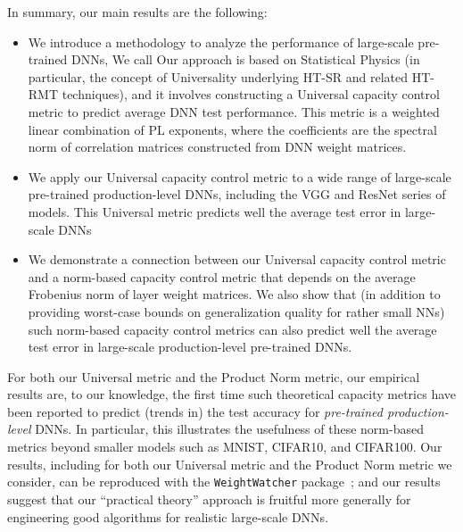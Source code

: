 In summary, our main results are the following:
\begin{itemize}
\item
We introduce a  methodology to analyze the performance of large-scale pre-trained DNNs, 
We call 
Our approach is based on Statistical Physics (in particular, the concept of Universality underlying HT-SR and related HT-RMT techniques), and it involves constructing a Universal capacity control metric to predict average DNN test performance.
This metric is a weighted linear combination of PL exponents, where the coefficients are the spectral norm of correlation matrices constructed from DNN weight matrices.
\item
We apply our Universal capacity control metric to a wide range of large-scale pre-trained production-level DNNs, including the VGG and ResNet series of models.
This Universal metric predicts well the average test error in large-scale DNNs
\item
We demonstrate a connection between our Universal capacity control metric and a norm-based capacity control metric that depends on the average Frobenius norm of layer weight matrices.
We also show that (in addition to providing worst-case bounds on generalization quality for rather small NNs) such norm-based capacity control metrics can also predict well the average test error in large-scale production-level pre-trained DNNs.
\end{itemize}
For both our Universal metric and the Product Norm metric, our empirical results are, to our knowledge, the first time such theoretical capacity metrics have been reported to predict (trends in) the test accuracy for \emph{pre-trained production-level} DNNs.
In particular, this illustrates the usefulness of these norm-based metrics beyond smaller models such as MNIST, CIFAR10, and CIFAR100. 
Our 
results, including for both our Universal metric and the Product Norm metric we consider, can be reproduced with the \texttt{WeightWatcher} package~\cite{weightwatcher_pagkage}; and our
results suggest that our ``practical theory'' approach is fruitful more generally for engineering good algorithms for realistic large-scale DNNs.


